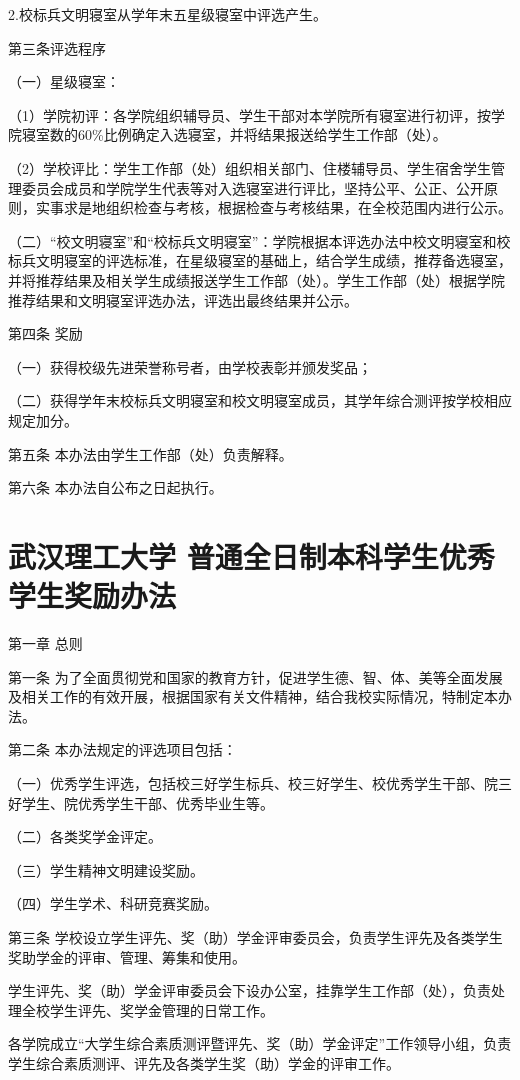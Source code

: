 \documentclass[UTF8,12pt,a4paper]{report}
\begin{document}
2.校标兵文明寝室从学年末五星级寝室中评选产生。

第三条评选程序

（一）星级寝室：

（1）学院初评：各学院组织辅导员、学生干部对本学院所有寝室进行初评，按学院寝室数的60\%比例确定入选寝室，并将结果报送给学生工作部（处）。

（2）学校评比：学生工作部（处）组织相关部门、住楼辅导员、学生宿舍学生管理委员会成员和学院学生代表等对入选寝室进行评比，坚持公平、公正、公开原则，实事求是地组织检查与考核，根据检查与考核结果，在全校范围内进行公示。

（二）“校文明寝室”和“校标兵文明寝室”：学院根据本评选办法中校文明寝室和校标兵文明寝室的评选标准，在星级寝室的基础上，结合学生成绩，推荐备选寝室，并将推荐结果及相关学生成绩报送学生工作部（处）。学生工作部（处）根据学院推荐结果和文明寝室评选办法，评选出最终结果并公示。

第四条 奖励

（一）获得校级先进荣誉称号者，由学校表彰并颁发奖品；

（二）获得学年末校标兵文明寝室和校文明寝室成员，其学年综合测评按学校相应规定加分。

第五条 本办法由学生工作部（处）负责解释。

第六条 本办法自公布之日起执行。

\chapter{武汉理工大学 普通全日制本科学生优秀学生奖励办法}
第一章  总则

第一条  为了全面贯彻党和国家的教育方针，促进学生德、智、体、美等全面发展及相关工作的有效开展，根据国家有关文件精神，结合我校实际情况，特制定本办法。

第二条  本办法规定的评选项目包括：

（一）优秀学生评选，包括校三好学生标兵、校三好学生、校优秀学生干部、院三好学生、院优秀学生干部、优秀毕业生等。

（二）各类奖学金评定。

（三）学生精神文明建设奖励。

（四）学生学术、科研竞赛奖励。

第三条  学校设立学生评先、奖（助）学金评审委员会，负责学生评先及各类学生奖助学金的评审、管理、筹集和使用。

学生评先、奖（助）学金评审委员会下设办公室，挂靠学生工作部（处），负责处理全校学生评先、奖学金管理的日常工作。

各学院成立“大学生综合素质测评暨评先、奖（助）学金评定”工作领导小组，负责学生综合素质测评、评先及各类学生奖（助）学金的评审工作。
\end{document}

